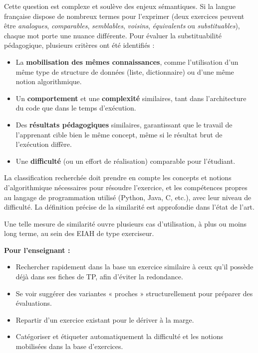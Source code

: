 \documentclass[12pt,a4paper,oneside]{report}
\begin{document}
Cette question est complexe et soulève des enjeux sémantiques. Si la langue française dispose de nombreux termes pour l'exprimer (deux exercices peuvent être \emph{analogues}, \emph{comparables}, \emph{semblables}, \emph{voisins}, \emph{équivalents} ou \emph{substituables}), chaque mot porte une nuance différente. Pour évaluer la substituabilité pédagogique, plusieurs critères ont été identifiés :
\begin{itemize}
    \item La \textbf{mobilisation des mêmes connaissances}, comme l'utilisation d'un même type de structure de données (liste, dictionnaire) ou d'une même notion algorithmique.
    \item Un \textbf{comportement} et une \textbf{complexité} similaires, tant dans l'architecture du code que dans le temps d'exécution.
    \item Des \textbf{résultats pédagogiques} similaires, garantissant que le travail de l'apprenant cible bien le même concept, même si le résultat brut de l'exécution diffère.
    \item Une \textbf{difficulté} (ou un effort de réalisation) comparable pour l'étudiant.
\end{itemize}

La classification recherchée doit prendre en
compte les concepts et notions d'algorithmique
nécessaires pour résoudre l'exercice, et les compétences propres au langage
de programmation utilisé (Python, Java, C, etc.), avec leur niveau de difficulté. La définition précise de la similarité est approfondie dans
l'état de l'art.

Une telle mesure de similarité ouvre plusieurs cas d'utilisation, à plus ou
moins long terme, au sein des EIAH de type exerciseur.

\textbf{Pour l'enseignant :}
\begin{itemize}
    \item Rechercher rapidement dans la base un exercice similaire à ceux qu'il possède déjà dans ses fiches de TP, afin d'éviter la redondance.
    \item Se voir suggérer des variantes « proches » structurellement pour préparer des évaluations.
    \item Repartir d'un exercice existant pour le dériver à la marge.
    \item Catégoriser et étiqueter automatiquement la difficulté et les notions mobilisées dans la base d'exercices.
\end{itemize}
\end{document}
